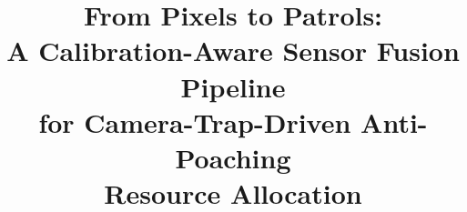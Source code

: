\documentclass[conference]{IEEEtran}
\begin{document}
\title{From Pixels to Patrols:\\
A Calibration-Aware Sensor Fusion Pipeline\\
for Camera-Trap-Driven Anti-Poaching\\
Resource Allocation}


\maketitle

\renewcommand{\thefootnote}{\dag}
\renewcommand{\thefootnote}{\arabic{footnote}}
\end{document}
